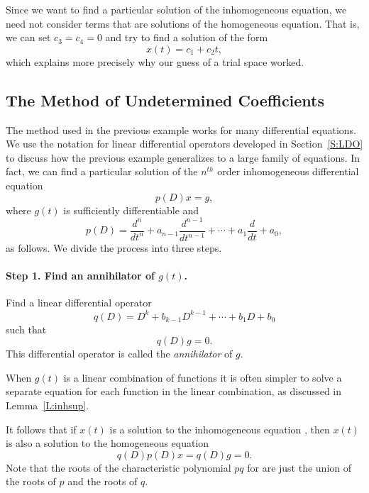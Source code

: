 \documentclass{ximera}
\begin{document}
Since we want to find a particular solution 
of the inhomogeneous equation, 
we need not consider terms that are solutions of the homogeneous equation. 
That is, we can set $c_3=c_4=0$ and try to find a solution of the form
\[
x(t) = c_1 + c_2 t,
\]
which explains more precisely why our guess of a trial space worked.


\subsection*{The Method of Undetermined Coefficients}

The method used in the previous example works for many differential 
equations.  We use the notation for 
linear differential operators 
developed in Section~\ref{S:LDO} to discuss how the previous example 
generalizes to a large family of equations.  In fact, we can find a 
particular solution of the $n^{th}$ order inhomogeneous differential equation 
\begin{equation}  \label{eq:nconst2}
p(D)x = g,
\end{equation}
where $g(t)$ is sufficiently differentiable and 
\[
p(D) = \frac{d^n}{dt^n} + a_{n-1}\frac{d^{n-1}}{dt^{n-1}} + \cdots + 
a_1\frac{d}{dt}+a_0,
\]
as follows.  We divide the process into three steps.

\paragraph{Step 1. Find an annihilator of $g(t)$.} 
Find a linear differential operator 
\[
q(D) = D^k + b_{k-1}D^{k-1} + \cdots + b_1D+b_0
\]
such that 
\begin{equation}  \label{eq:undetcoeffb}
q(D)g = 0.
\end{equation}
This differential operator is called the {\em annihilator\/} of $g$. 

  When $g(t)$ is a linear combination of functions
it is often simpler to solve a separate equation for each function in the 
linear combination, as discussed in Lemma~\ref{L:inhsup}.

It follows that if $x(t)$ is a solution to the 
inhomogeneous equation , then $x(t)$ is 
also a solution to the homogeneous equation 
\begin{equation}  \label{E:prodode}
q(D)p(D)x = q(D)g = 0.
\end{equation}
Note that the roots of the 
characteristic 
polynomial 
$pq$ for 
are just the union of the roots of $p$ and the roots of $q$.  
\end{document}
